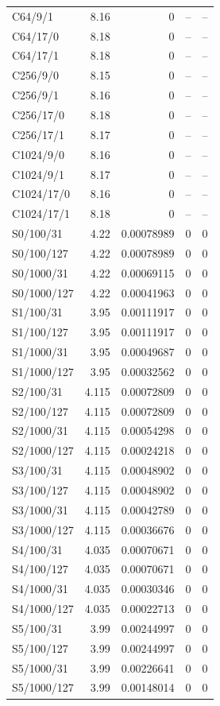 \begin{longtable}{lrrrr}
C64/9/1 & 8.16 & 0 & -- & -- \\
C64/17/0 & 8.18 & 0 & -- & -- \\
C64/17/1 & 8.18 & 0 & -- & -- \\
C256/9/0 & 8.15 & 0 & -- & -- \\
C256/9/1 & 8.16 & 0 & -- & -- \\
C256/17/0 & 8.18 & 0 & -- & -- \\
C256/17/1 & 8.17 & 0 & -- & -- \\
C1024/9/0 & 8.16 & 0 & -- & -- \\
C1024/9/1 & 8.17 & 0 & -- & -- \\
C1024/17/0 & 8.16 & 0 & -- & -- \\
C1024/17/1 & 8.18 & 0 & -- & -- \\
S0/100/31 & 4.22 & 0.00078989 & 0 & 0 \\
S0/100/127 & 4.22 & 0.00078989 & 0 & 0 \\
S0/1000/31 & 4.22 & 0.00069115 & 0 & 0 \\
S0/1000/127 & 4.22 & 0.00041963 & 0 & 0 \\
S1/100/31 & 3.95 & 0.00111917 & 0 & 0 \\
S1/100/127 & 3.95 & 0.00111917 & 0 & 0 \\
S1/1000/31 & 3.95 & 0.00049687 & 0 & 0 \\
S1/1000/127 & 3.95 & 0.00032562 & 0 & 0 \\
S2/100/31 & 4.115 & 0.00072809 & 0 & 0 \\
S2/100/127 & 4.115 & 0.00072809 & 0 & 0 \\
S2/1000/31 & 4.115 & 0.00054298 & 0 & 0 \\
S2/1000/127 & 4.115 & 0.00024218 & 0 & 0 \\
S3/100/31 & 4.115 & 0.00048902 & 0 & 0 \\
S3/100/127 & 4.115 & 0.00048902 & 0 & 0 \\
S3/1000/31 & 4.115 & 0.00042789 & 0 & 0 \\
S3/1000/127 & 4.115 & 0.00036676 & 0 & 0 \\
S4/100/31 & 4.035 & 0.00070671 & 0 & 0 \\
S4/100/127 & 4.035 & 0.00070671 & 0 & 0 \\
S4/1000/31 & 4.035 & 0.00030346 & 0 & 0 \\
S4/1000/127 & 4.035 & 0.00022713 & 0 & 0 \\
S5/100/31 & 3.99 & 0.00244997 & 0 & 0 \\
S5/100/127 & 3.99 & 0.00244997 & 0 & 0 \\
S5/1000/31 & 3.99 & 0.00226641 & 0 & 0 \\
S5/1000/127 & 3.99 & 0.00148014 & 0 & 0 \\
\bottomrule
\end{longtable}
